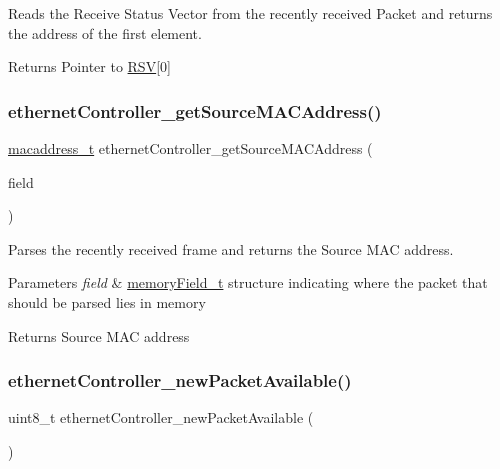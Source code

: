 Reads the Receive Status Vector from the recently received Packet and returns the address of the first element. 

\begin{DoxyReturn}{Returns}
Pointer to \mbox{\hyperlink{struct_r_s_v}{R\+SV}}\mbox{[}0\mbox{]} 
\end{DoxyReturn}
\mbox{\label{group__data__reception_gabe0967f5f15ce26c4bb723036e566afe}} 
\subsubsection{\texorpdfstring{ethernetController\_getSourceMACAddress()}{ethernetController\_getSourceMACAddress()}}
{\footnotesize\ttfamily \mbox{\hyperlink{group__ethernet_gacb865bcbf50a6c8cef05581bfabff373}{macaddress\+\_\+t}} ethernet\+Controller\+\_\+get\+Source\+M\+A\+C\+Address (\begin{DoxyParamCaption}\item[{\mbox{\hyperlink{group__memory_ga1d04d80fae40964f55d2df46b5d64785}{memory\+Field\+\_\+t}}}]{field }\end{DoxyParamCaption})}



Parses the recently received frame and returns the Source M\+AC address. 


\begin{DoxyParams}{Parameters}
{\em field} & \mbox{\hyperlink{group__memory_ga1d04d80fae40964f55d2df46b5d64785}{memory\+Field\+\_\+t}} structure indicating where the packet that should be parsed lies in memory \\
\hline
\end{DoxyParams}
\begin{DoxyReturn}{Returns}
Source M\+AC address 
\end{DoxyReturn}
\mbox{\label{group__data__reception_gae030bd0d97a72b4c38d3ac55132dd7f3}} 
\subsubsection{\texorpdfstring{ethernetController\_newPacketAvailable()}{ethernetController\_newPacketAvailable()}}
{\footnotesize\ttfamily uint8\+\_\+t ethernet\+Controller\+\_\+new\+Packet\+Available (\begin{DoxyParamCaption}{ }\end{DoxyParamCaption})}



